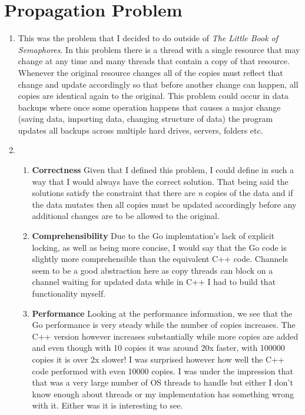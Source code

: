 \documentclass[11pt]{article}
\begin{document}
\section{Propagation Problem}
\begin{enumerate}
	\item This was the problem that I decided to do outside of \textit{The Little Book of Semaphores}. In this problem there is a thread with a single resource that may change at any time and many threads that contain a copy of that resource. Whenever the original resource changes all of the copies must reflect that change and update accordingly so that before another change can happen, all copies are identical again to the original. This problem could occur in data backups where once some operation happens that causes a major change (saving data, importing data, changing structure of data) the program updates all backups across multiple hard drives, servers, folders etc.

	\item 
	\begin{enumerate}
	\item \textbf{Correctness}\linebreak
	Given that I defined this problem, I could define in such a way that I would always have the correct solution. That being said  the solutions satisfy the constraint that there are \textit{n} copies of the data and if the data mutates then all copies must be updated accordingly before any additional changes are to be allowed to the original.
	\item \textbf{Comprehensibility}\linebreak
	Due to the Go implemtation's lack of explicit locking, as well as being more concise, I would say that the Go code is slightly more comprehensible than the equivalent C++ code. Channels seem to be a good abstraction here as copy threads can block on a channel waiting for updated data while in C++ I had to build that functionality myself.
	\item \textbf{Performance}\linebreak
	Looking at the performance information, we see that the Go performance is very steady while the number of copies increases. The C++ version however increases substantially while more copies are added and even though with 10 copies it was around 20x faster, with 100000 copies it is over 2x slower! I was surprised however how well the C++ code performed with even 10000 copies. I was under the impression that that was a very large number of OS threads to handle but either I don't know enough about threads or my implementation has something wrong with it. Either was it is interesting to see.
	\end{enumerate}	
\end{enumerate}
\end{document}
